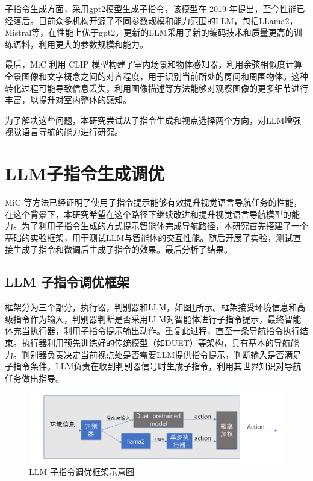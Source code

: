 \documentclass[bachelor]{thesis-uestc}
\begin{document}
子指令生成方面，采用gpt2模型生成子指令，该模型在 2019 年提出，至今性能已经落后。目前众多机构开源了不同参数规模和能力范围的LLM，包括LLama2\cite{touvronLlamaOpenFoundation2023}，Mistral\cite{jiang2023mistral}等，在性能上优于gpt2。更新的LLM采用了新的编码技术和质量更高的训练语料，利用更大的参数规模和能力。

最后，MiC 利用 CLIP 模型构建了室内场景和物体感知器，利用余弦相似度计算全景图像和文字概念之间的对齐程度，用于识别当前所处的房间和周围物体。这种转化过程可能导致信息丢失，利用图像描述等方法能够对观察图像的更多细节进行丰富，以提升对室内整体的感知。

为了解决这些问题，本研究尝试从子指令生成和视点选择两个方向，对LLM增强视觉语言导航的能力进行研究。

\section{LLM子指令生成调优}

MiC 等方法已经证明了使用子指令提示能够有效提升视觉语言导航任务的性能，在这个背景下，本研究希望在这个路径下继续改进和提升视觉语言导航模型的能力。为了利用子指令生成的方式提示智能体完成导航路径，本研究首先搭建了一个基础的实验框架，用于测试LLM与智能体的交互性能。随后开展了实验，测试直接生成子指令和微调后生成子指令的效果。最后分析了结果。

\subsection{LLM 子指令调优框架}

框架分为三个部分，执行器，判别器和LLM，如图\ref{ft}所示。框架接受环境信息和高级指令作为输入，判别器判断是否采用LLM对智能体进行子指令提示，最终智能体充当执行器，利用子指令提示输出动作。重复此过程，直至一条导航指令执行结束。执行器利用预先训练好的传统模型（如DUET）等架构，具有基本的导航能力。判别器负责决定当前视点处是否需要LLM提供指令提示，判断输入是否满足子指令条件。LLM负责在收到判别器信号时生成子指令，利用其世界知识对导航任务做出指导。

\begin {figure}[h]
\centering %
\includegraphics[width=\textwidth]{1932-042816.png}
\caption{LLM 子指令调优框架示意图} %
\label{ft}
\end {figure}
\end{document}
